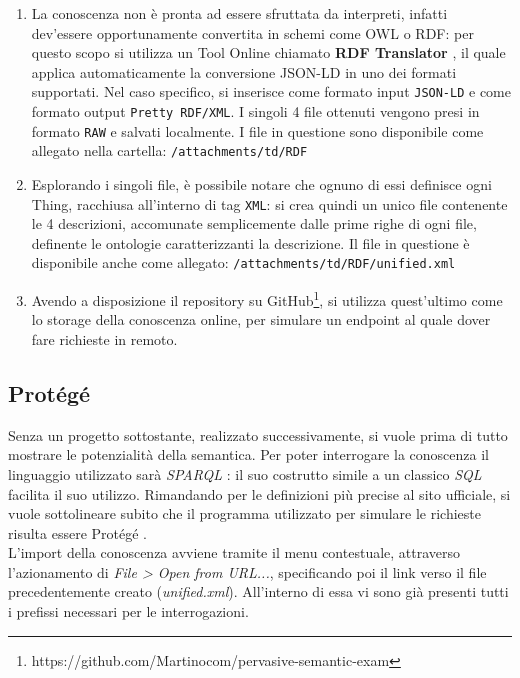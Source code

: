\documentclass[12pt,a4paper,openright,oneside]{report}
\begin{document}
\begin{enumerate}
	\item La conoscenza non è pronta ad essere sfruttata da interpreti, infatti dev'essere opportunamente convertita in schemi come OWL o RDF: per questo scopo si utilizza un Tool Online chiamato \textbf{RDF Translator} \cite{rdf-translator}, il quale applica automaticamente la conversione JSON-LD in uno dei formati supportati. Nel caso specifico, si inserisce come formato input \texttt{JSON-LD} e come formato output \texttt{Pretty RDF/XML}. I singoli 4 file ottenuti vengono presi in formato \texttt{RAW} e salvati localmente. I file in questione sono disponibile come allegato nella cartella:
	\texttt{/attachments/td/RDF}
	
	\item Esplorando i singoli file, è possibile notare che ognuno di essi definisce ogni Thing, racchiusa all'interno di tag \texttt{XML}: si crea quindi un unico file contenente le 4 descrizioni, accomunate semplicemente dalle prime righe di ogni file, definente le ontologie caratterizzanti la descrizione. Il file in questione è disponibile anche come allegato:	
	\texttt{/attachments/td/RDF/unified.xml}
	
	\item Avendo a disposizione il repository su GitHub\footnote{https://github.com/Martinocom/pervasive-semantic-exam}, si utilizza quest'ultimo come lo storage della conoscenza online, per simulare un endpoint al quale dover fare richieste in remoto.
\end{enumerate}

\subsection{Protégé}
Senza un progetto sottostante, realizzato successivamente, si vuole prima di tutto mostrare le potenzialità della semantica. Per poter interrogare la conoscenza il linguaggio utilizzato sarà \textit{SPARQL} \cite{sparql}: il suo costrutto simile a un classico \textit{SQL} facilita il suo utilizzo. Rimandando per le definizioni più precise al sito ufficiale, si vuole sottolineare subito che il programma utilizzato per simulare le richieste risulta essere Protégé \cite{protege}.\\

L'import della conoscenza avviene tramite il menu contestuale, attraverso l'azionamento di \textit{File > Open from URL...}, specificando poi il link verso il file precedentemente creato (\textit{unified.xml}). All'interno di essa vi sono già presenti tutti i prefissi necessari per le interrogazioni.
\end{document}
